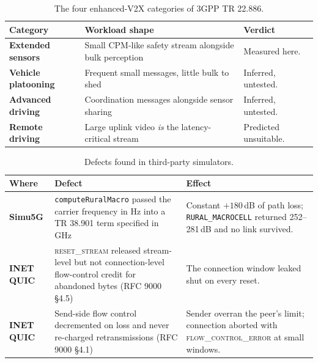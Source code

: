 \begin{table}[htbp]
  \centering
  \caption{The four enhanced-V2X categories of 3GPP TR 22.886.}
  \label{tab:ev2x}
  \begin{tabular}{@{}>{\RaggedRight}p{}>{\RaggedRight}p{}>{\RaggedRight}p{}@{}}
    \toprule
    Category & Workload shape & Verdict \\
    \midrule
    \textbf{Extended sensors} & Small CPM-like safety stream alongside bulk perception
      & Measured here. \\
    \addlinespace
    \textbf{Vehicle platooning} & Frequent small messages, little bulk to shed
      & Inferred, untested. \\
    \addlinespace
    \textbf{Advanced driving} & Coordination messages alongside sensor sharing
      & Inferred, untested. \\
    \addlinespace
    \textbf{Remote driving} & Large uplink video \emph{is} the latency-critical stream
      & Predicted unsuitable. \\
    \bottomrule
  \end{tabular}
\end{table}


\begin{table}[htbp]
  \centering
  \caption{Defects found in third-party simulators.}
  \label{tab:upstream-bugs}
  \begin{tabular}{@{}>{\RaggedRight}p{}>{\RaggedRight}p{}>{\RaggedRight}p{}@{}}
    \toprule
    Where & Defect & Effect \\
    \midrule
    \textbf{Simu5G} & \texttt{computeRuralMacro} passed the carrier frequency in Hz into a
      TR 38.901 term specified in GHz
      & Constant $+180$\,dB of path loss; \texttt{RURAL\_MACROCELL} returned 252--281\,dB and no
        link survived. \\
    \addlinespace
    \textbf{INET QUIC} & \textsc{reset\_stream} released stream-level but not connection-level
      flow-control credit for abandoned bytes (RFC 9000 §4.5)
      & The connection window leaked shut on every reset. \\
    \addlinespace
    \textbf{INET QUIC} & Send-side flow control decremented on loss and never re-charged
      retransmissions (RFC 9000 §4.1)
      & Sender overran the peer's limit; connection aborted with
        \textsc{flow\_control\_error} at small windows. \\
    \bottomrule
  \end{tabular}
\end{table}
